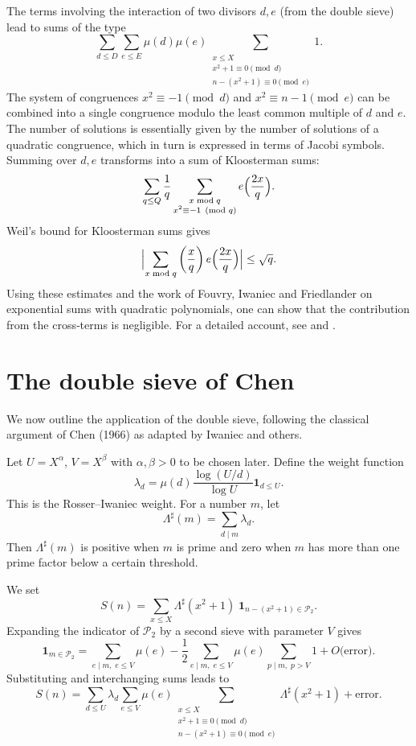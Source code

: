 \documentclass[11pt,a4paper]{article}
\begin{document}
The terms involving the interaction of two divisors \(d,e\) (from the double sieve) lead to sums of the type
\[
\sum_{d\le D}\sum_{e\le E} \mu(d)\mu(e) \sum_{\substack{x\le X \\ x^{2}+1\equiv 0\pmod d \\ n-(x^{2}+1)\equiv 0\pmod e}} 1.
\]
The system of congruences \(x^{2}\equiv -1\pmod d\) and \(x^{2}\equiv n-1\pmod e\) can be combined into a single congruence modulo the least common multiple of \(d\) and \(e\). The number of solutions is essentially given by the number of solutions of a quadratic congruence, which in turn is expressed in terms of Jacobi symbols. Summing over \(d,e\) transforms into a sum of Kloosterman sums:
\[
\sum_{q\le Q} \frac{1}{q} \sum_{\substack{x\bmod q \\ x^{2}\equiv -1\pmod q}} e\Bigl(\frac{2x}{q}\Bigr).
\]
Weil's bound for Kloosterman sums gives
\[
\Bigl|\sum_{x\bmod q} \left(\frac{x}{q}\right) e\Bigl(\frac{2x}{q}\Bigr)\Bigr| \le \sqrt{q}.
\]
Using these estimates and the work of Fouvry, Iwaniec and Friedlander on exponential sums with quadratic polynomials, one can show that the contribution from the cross‑terms is negligible. For a detailed account, see \cite{fouvry-iwaniec2010} and \cite{friedlander-iwaniec1998}.

\section{The double sieve of Chen}

We now outline the application of the double sieve, following the classical argument of Chen (1966) as adapted by Iwaniec and others.

Let \(U = X^{\alpha}\), \(V = X^{\beta}\) with \(\alpha,\beta>0\) to be chosen later. Define the weight function
\[
\lambda_{d} = \mu(d) \frac{\log(U/d)}{\log U} \mathbf{1}_{d\le U}.
\]
This is the Rosser–Iwaniec weight. For a number \(m\), let
\[
\Lambda^{\sharp}(m) = \sum_{d\mid m} \lambda_{d}.
\]
Then \(\Lambda^{\sharp}(m)\) is positive when \(m\) is prime and zero when \(m\) has more than one prime factor below a certain threshold.

We set
\[
S(n) = \sum_{x\le X} \Lambda^{\sharp}(x^{2}+1)\; \mathbf{1}_{n-(x^{2}+1)\in\mathcal{P}_{2}}.
\]
Expanding the indicator of \(\mathcal{P}_{2}\) by a second sieve with parameter \(V\) gives
\[
\mathbf{1}_{m\in\mathcal{P}_{2}} = \sum_{e\mid m,\; e\le V} \mu(e) - \frac12 \sum_{e\mid m,\; e\le V} \mu(e) \sum_{p\mid m,\; p>V} 1 + O\bigl(\text{error}\bigr).
\]
Substituting and interchanging sums leads to
\[
S(n) = \sum_{d\le U} \lambda_{d} \sum_{e\le V} \mu(e) \sum_{\substack{x\le X \\ x^{2}+1\equiv 0\pmod d \\ n-(x^{2}+1)\equiv 0\pmod e}} \Lambda^{\sharp}(x^{2}+1) + \text{error}.
\]
\end{document}
